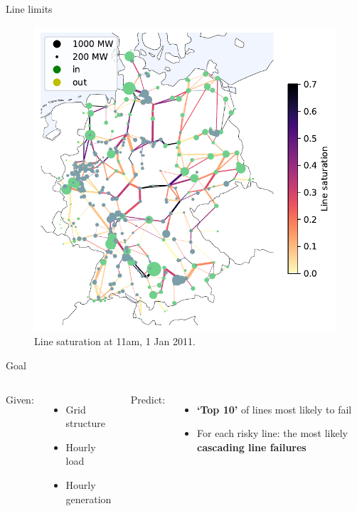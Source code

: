 \documentclass[10pt]{beamer}
\begin{document}
\begin{frame}{Line limits}
    \begin{figure}
    \includegraphics[height=.69\paperheight]{img/nominal_flow_and_injection.pdf}
    \caption{Line saturation at 11am, 1 Jan 2011.}
    \end{figure}
\end{frame}

\begin{frame}{Goal}
    \begin{columns}[T,onlytextwidth]
    Given:
    \begin{itemize}
        \item Grid structure
        \item Hourly load
        \item Hourly generation
    \end{itemize}
    
    Predict:
    \begin{itemize}
        \item \textbf{`Top 10'} of lines most likely to fail
        \item For each risky line: the most likely \textbf{cascading line failures}
    \end{itemize}
    \end{columns}
\end{frame}
\end{document}
